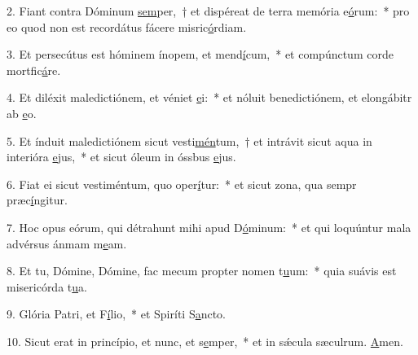 2. Fiant contra Dóminum \uline{sem}per,~† et dispéreat de terra memória e\uline{ó}rum:~* pro eo quod non est recordátus fácere misric\uline{ó}rdiam.\par 
3. Et persecútus est hóminem ínopem, et mend\uline{í}cum,~* et compúnctum corde mortfic\uline{á}re.\par 
4. Et diléxit maledictiónem, et véniet \uline{e}i:~* et nóluit benedictiónem, et elongábitr ab \uline{e}o.\par 
5. Et índuit maledictiónem sicut vesti\uline{mén}tum,~† et intrávit sicut aqua in interióra \uline{e}jus,~* et sicut óleum in óssbus \uline{e}jus.\par 
6. Fiat ei sicut vestiméntum, quo oper\uline{í}tur:~* et sicut zona, qua sempr præc\uline{í}ngitur.\par 
7. Hoc opus eórum, qui détrahunt mihi apud D\uline{ó}minum:~* et qui loquúntur mala advérsus ánmam m\uline{e}am.\par 
8. Et tu, Dómine, Dómine, fac mecum propter nomen t\uline{u}um:~* quia suávis est misericórda t\uline{u}a.\par 
9. Glória Patri, et F\uline{í}lio,~* et Spiríti S\uline{a}ncto.\par 
10. Sicut erat in princípio, et nunc, et s\uline{e}mper,~* et in sǽcula sæculrum. \uline{A}men.\par 
